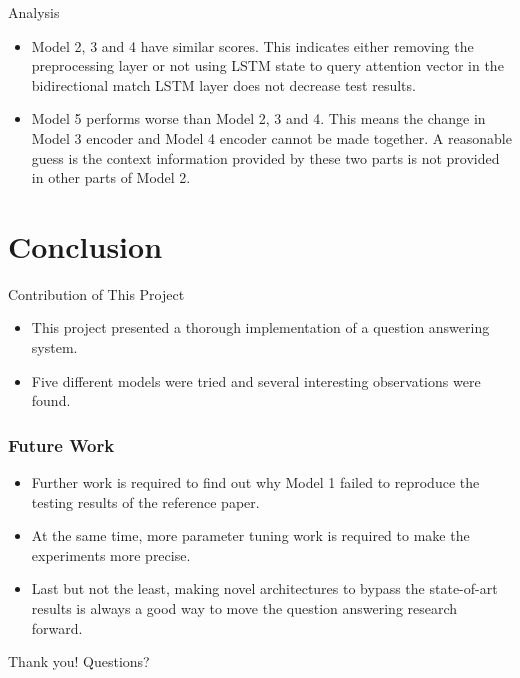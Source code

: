 \documentclass{beamer}
\begin{document}
\begin{frame}{Analysis}
    \begin{itemize}
        \item Model 2, 3 and 4 have similar scores. This indicates either removing the preprocessing layer or not using LSTM state to query attention vector in the bidirectional match LSTM layer does not decrease test results.

        \item Model 5 performs worse than Model 2, 3 and 4. This means the change in Model 3 encoder and Model 4 encoder cannot be made together. A reasonable guess is the context information provided by these two parts is not provided in other parts of Model 2.
    \end{itemize}
\end{frame}

\section{Conclusion}

\begin{frame}{Contribution of This Project}
    \begin{itemize}
        \item This project presented a thorough implementation of a question answering system. \item Five different models were tried and several interesting observations were found.
    \end{itemize}

\end{frame}

\begin{frame} \frametitle{Future Work}
    \begin{itemize}
        \item Further work is required to find out why Model 1 failed to reproduce the testing results of the reference paper.
        \item At the same time, more parameter tuning work is required to make the experiments more precise. \item Last but not the least, making novel architectures to bypass the state-of-art results is always a good way to move the question answering research forward.
    \end{itemize}
\end{frame}

\begin{frame}
Thank you! Questions?
\end{frame}
\end{document}
